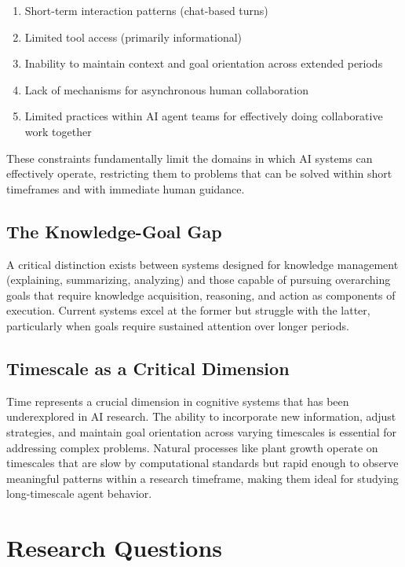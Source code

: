 \documentclass[12pt,letterpaper]{article}
\begin{document}
\begin{enumerate}
    \item Short-term interaction patterns (chat-based turns)
    \item Limited tool access (primarily informational)
    \item Inability to maintain context and goal orientation across extended periods
    \item Lack of mechanisms for asynchronous human collaboration
    \item Limited practices within AI agent teams for effectively doing collaborative work together
\end{enumerate}

These constraints fundamentally limit the domains in which AI systems can effectively operate, restricting them to problems that can be solved within short timeframes and with immediate human guidance.

\subsection{The Knowledge-Goal Gap}

A critical distinction exists between systems designed for knowledge management (explaining, summarizing, analyzing) and those capable of pursuing overarching goals that require knowledge acquisition, reasoning, and action as components of execution. Current systems excel at the former but struggle with the latter, particularly when goals require sustained attention over longer periods.

\subsection{Timescale as a Critical Dimension}

Time represents a crucial dimension in cognitive systems that has been underexplored in AI research. The ability to incorporate new information, adjust strategies, and maintain goal orientation across varying timescales is essential for addressing complex problems. Natural processes like plant growth operate on timescales that are slow by computational standards but rapid enough to observe meaningful patterns within a research timeframe, making them ideal for studying long-timescale agent behavior.

\section{Research Questions}
\end{document}
